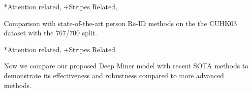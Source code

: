 \documentclass[final]{cvpr}
\begin{document}
\begin{table}[]
{}
*Attention related, +Stripes Related, 
\caption{Comparison with state-of-the-art person Re-ID methods
on the the CUHK03 dataset with the 767/700 split.}
\label{tab:cuhk}
\end{table}




\begin{table}[]
\centering
{}
*Attention related, +Stripes Related
\caption{Comparison with state-of-the-art person Re-ID methods
on the MSMT17 dataset.}
\label{tab:msmt17}
\end{table}


Now we compare our proposed Deep Miner model with recent SOTA methods to demonstrate its effectiveness and robustness compared to more advanced methods.
\end{document}
